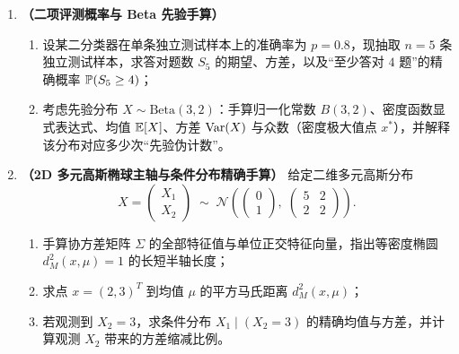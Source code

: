 \begin{enumerate}[label=\textbf{2.\arabic*}, leftmargin=2.4em, resume]
  \item \textbf{（二项评测概率与 Beta 先验手算）}
  \begin{enumerate}[label=(\arabic*), leftmargin=1.8em]
    \item 设某二分类器在单条独立测试样本上的准确率为 $p = 0.8$，现抽取 $n = 5$ 条独立测试样本，求答对题数 $S_5$ 的期望、方差，以及“至少答对 $4$ 题”的精确概率 $\mathbb{P}(S_5 \ge 4)$；
    \item 考虑先验分布 $X \sim \mathrm{Beta}(3, 2)$：手算归一化常数 $B(3, 2)$、密度函数显式表达式、均值 $\mathbb{E}[X]$、方差 $\operatorname{Var}(X)$ 与众数（密度极大值点 $x^*$），并解释该分布对应多少次“先验伪计数”。
  \end{enumerate}

  \item \textbf{（2D 多元高斯椭球主轴与条件分布精确手算）} 给定二维多元高斯分布
  \[
    X = \begin{pmatrix} X_1 \\ X_2 \end{pmatrix}
    \;\sim\;
    \mathcal{N}\!\left(\begin{pmatrix} 0 \\ 1 \end{pmatrix},\; \begin{pmatrix} 5 & 2 \\ 2 & 2 \end{pmatrix}\right).
  \]
  \begin{enumerate}[label=(\arabic*), leftmargin=1.8em]
    \item 手算协方差矩阵 $\Sigma$ 的全部特征值与单位正交特征向量，指出等密度椭圆 $d_M^2(x, \mu) = 1$ 的长短半轴长度；
    \item 求点 $x = (2, 3)^T$ 到均值 $\mu$ 的平方马氏距离 $d_M^2(x, \mu)$；
    \item 若观测到 $X_2 = 3$，求条件分布 $X_1 \mid (X_2 = 3)$ 的精确均值与方差，并计算观测 $X_2$ 带来的方差缩减比例。
  \end{enumerate}
\end{enumerate}


